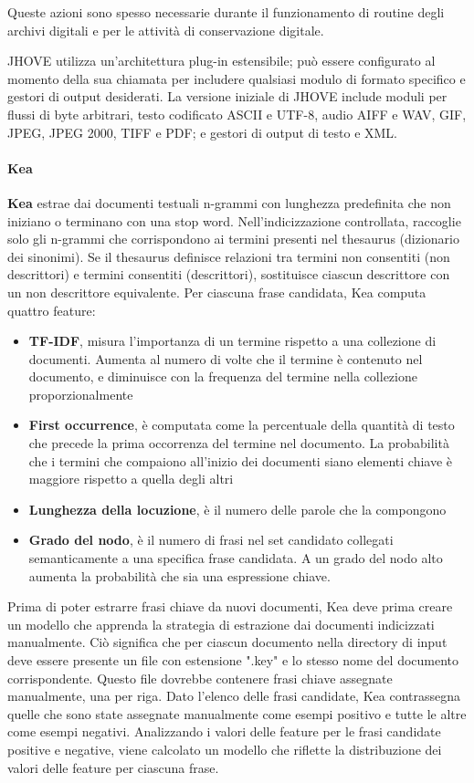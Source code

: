 Queste azioni sono spesso necessarie durante il funzionamento di routine degli archivi digitali e per le attività di conservazione digitale.

JHOVE utilizza un'architettura plug-in estensibile; può essere configurato al momento della sua chiamata per includere qualsiasi modulo di formato specifico e gestori di output desiderati. La versione iniziale di JHOVE include moduli per flussi di byte arbitrari, testo codificato ASCII e UTF-8, audio AIFF e WAV, GIF, JPEG, JPEG 2000, TIFF e PDF; e gestori di output di testo e XML.

\paragraph{Kea}
\textbf{Kea} estrae dai documenti testuali n-grammi con lunghezza predefinita che non iniziano o terminano con una stop word. Nell'indicizzazione controllata, raccoglie solo gli n-grammi che corrispondono ai termini presenti nel thesaurus (dizionario dei sinonimi). Se il thesaurus definisce relazioni tra termini non consentiti (non descrittori) e termini consentiti (descrittori), sostituisce ciascun descrittore con un non descrittore equivalente. Per ciascuna frase candidata, Kea computa quattro feature:
\begin{itemize}
\item{\textbf{TF-IDF}}, misura l'importanza di un termine rispetto a una collezione di documenti. Aumenta al numero di volte che il termine è contenuto nel documento, e diminuisce con la frequenza del termine nella collezione proporzionalmente
\item{\textbf{First occurrence}}, è computata come la percentuale della quantità di testo che precede la prima occorrenza del termine nel documento. La probabilità che i termini che compaiono all'inizio dei documenti siano elementi chiave è maggiore rispetto a quella degli altri
\item{\textbf{Lunghezza della locuzione}}, è il numero delle parole che la compongono
\item{\textbf{Grado del nodo}}, è il numero di frasi nel set candidato collegati semanticamente a una specifica frase candidata. A un grado del nodo alto aumenta la probabilità che sia una espressione chiave.
\end{itemize}

Prima di poter estrarre frasi chiave da nuovi documenti, Kea deve prima creare un modello che apprenda la strategia di estrazione dai documenti indicizzati manualmente. Ciò significa che per ciascun documento nella directory di input deve essere presente un file con estensione ".key" e lo stesso nome del documento corrispondente. Questo file dovrebbe contenere frasi chiave assegnate manualmente, una per riga.
Dato l'elenco delle frasi candidate, Kea contrassegna quelle che sono state assegnate manualmente come esempi positivo e tutte le altre come esempi negativi. Analizzando i valori delle feature per le frasi candidate positive e negative, viene calcolato un modello che riflette la distribuzione dei valori delle feature per ciascuna frase.

